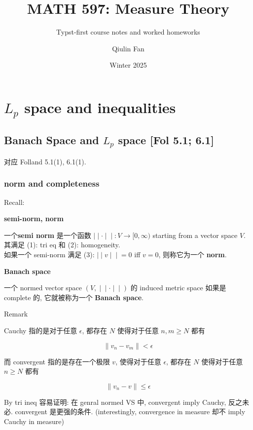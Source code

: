 \documentclass{qlnotes-export}
\title{MATH 597: Measure Theory}
\subtitle{Typst-first course notes and worked homeworks}
\author{Qiulin Fan}
\date{Winter 2025}
\begin{document}
\mainmatter
\chapter{\texorpdfstring{\(L_{p}\) space and inequalities}{L\_\{p\} space and inequalities}}\label{l_p-space-and-inequalities}

\section{\texorpdfstring{Banach Space and \(L_{p}\) space {[}Fol 5.1; 6.1{]}}{Banach Space and L\_\{p\} space {[}Fol 5.1; 6.1{]}}}

对应 Folland 5.1(1), 6.1(1).

\subsection{norm and completeness}\label{norm-and-completeness}

Recall:

\begin{definition}{\protect{}\label{kn-semi-norm-norm}{\textbf{semi-norm,
norm}}}

一个\textbf{semi norm} 是一个函数 \(\left. | \middle| \cdot \middle| \middle| :V\rightarrow\lbrack 0,\infty) \right.\) starting from a vector space \(V\). 其满足 (1): tri eq 和 (2): homogeneity.\\
如果一个 semi-norm 满足 (3): \(\left. | \middle| v \middle| \middle| = 0 \right.\) iff \(v = 0\), 则称它为一个 \textbf{norm}.

\end{definition}

\begin{definition}{\protect{}\label{kn-banach-space}{\textbf{Banach space}}}

一个 normed vector space \(\left. (V, \middle| \middle| \cdot \middle| \middle| ) \right.\) 的 induced metric space 如果是 complete 的, 它就被称为一个 \textbf{Banach space}.\\

\end{definition}

\begin{qlremark}{Remark}

Cauchy 指的是对于任意 \(\epsilon\), 都存在 \(N\) 使得对于任意 \(n,m \geq N\) 都有

\[\parallel v_{n} - v_{m} \parallel < \epsilon\]

而 convergent 指的是存在一个极限 \(v\), 使得对于任意 \(\epsilon\), 都存在 \(N\) 使得对于任意 \(n \geq N\) 都有

\[\parallel v_{n} - v \parallel \leq \epsilon\]

By tri ineq 容易证明: 在 genral normed VS 中, convergent imply Cauchy, 反之未必. convergent 是更强的条件. (interestingly, convergence in measure 却不 imply Cauchy in measure)

\end{qlremark}
\end{document}
